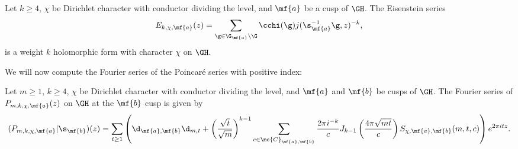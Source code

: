     \begin{theorem}
      Let $k \ge 4$, $\chi$ be Dirichlet character with conductor dividing the level, and $\mf{a}$ be a cusp of $\GH$. The Eisenstein series
      \[
        E_{k,\chi,\mf{a}}(z) = \sum_{\g \in \G_{\mf{a}}\backslash\G}\cchi(\g)j(\s_{\mf{a}}^{-1}\g,z)^{-k},
      \]
      is a weight $k$ holomorphic form with character $\chi$ on $\GH$.
    \end{theorem}

    We will now compute the Fourier series of the Poincar\'e series with positive index:

    \begin{proposition}\label{prop:Fourier_series_Poincare_holomorphic}
      Let $m \ge 1$, $k \ge 4$, $\chi$ be Dirichlet character with conductor dividing the level, and $\mf{a}$ and $\mf{b}$ be cusps of $\GH$. The Fourier series of $P_{m,k,\chi,\mf{a}}(z)$ on $\GH$ at the $\mf{b}$ cusp is given by
      \[
        (P_{m,k,\chi,\mf{a}}|\s_{\mf{b}})(z) = \sum_{t \ge 1}\left(\d_{\mf{a},\mf{b}}\d_{m,t}+\left(\frac{\sqrt{t}}{\sqrt{m}}\right)^{k-1}\sum_{c \in \mc{C}_{\mf{a},\mf{b}}}\frac{2\pi i^{-k}}{c}J_{k-1}\left(\frac{4\pi\sqrt{mt}}{c}\right)S_{\chi,\mf{a},\mf{b}}(m,t,c)\right)e^{2\pi itz}.
      \]
    \end{proposition}
